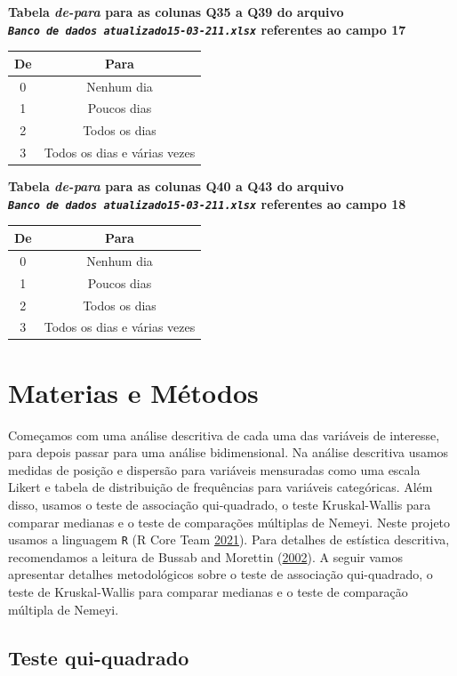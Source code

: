 \documentclass[]{article}
\begin{document}
\textbf{Tabela \emph{de-para} para as colunas Q35 a Q39 do arquivo \emph{\texttt{Banco\ de\ dados\ atualizado15-03-211.xlsx}} referentes ao campo 17}

\begin{longtable}[]{@{}cc@{}}
\toprule
De & Para\tabularnewline
\midrule
\endhead
0 & Nenhum dia\tabularnewline
1 & Poucos dias\tabularnewline
2 & Todos os dias\tabularnewline
3 & Todos os dias e várias vezes\tabularnewline
\bottomrule
\end{longtable}

\textbf{Tabela \emph{de-para} para as colunas Q40 a Q43 do arquivo \emph{\texttt{Banco\ de\ dados\ atualizado15-03-211.xlsx}} referentes ao campo 18}

\begin{longtable}[]{@{}cc@{}}
\toprule
De & Para\tabularnewline
\midrule
\endhead
0 & Nenhum dia\tabularnewline
1 & Poucos dias\tabularnewline
2 & Todos os dias\tabularnewline
3 & Todos os dias e várias vezes\tabularnewline
\bottomrule
\end{longtable}

\hypertarget{materias-e-muxe9todos}{%
\section{Materias e Métodos}\label{materias-e-muxe9todos}}

Começamos com uma análise descritiva de cada uma das variáveis de interesse, para depois passar para uma análise bidimensional. Na análise descritiva usamos medidas de posição e dispersão para variáveis mensuradas como uma escala Likert e tabela de distribuição de frequências para variáveis categóricas. Além disso, usamos o teste de associação qui-quadrado, o teste Kruskal-Wallis para comparar medianas e o teste de comparações múltiplas de Nemeyi. Neste projeto usamos a linguagem \texttt{R} (R Core Team \protect\hyperlink{ref-Rlang}{2021}). Para detalhes de estística descritiva, recomendamos a leitura de Bussab and Morettin (\protect\hyperlink{ref-bussab2002estatistica}{2002}). A seguir vamos apresentar detalhes metodológicos sobre o teste de associação qui-quadrado, o teste de Kruskal-Wallis para comparar medianas e o teste de comparação múltipla de Nemeyi.

\hypertarget{teste-qui-quadrado}{%
\subsection{Teste qui-quadrado}\label{teste-qui-quadrado}}
\end{document}
